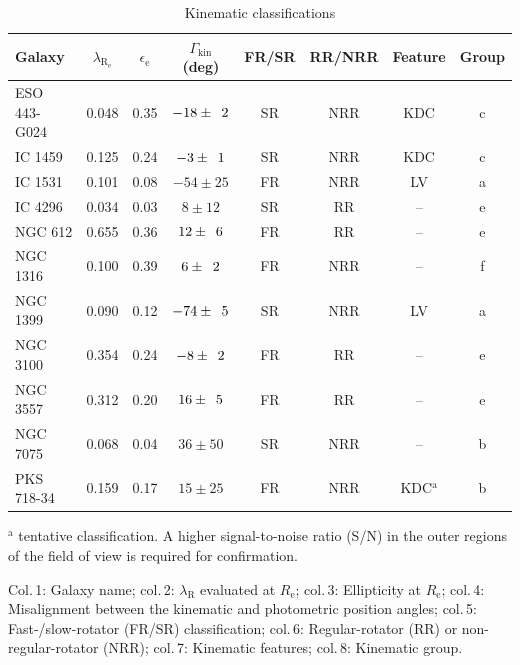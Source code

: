 		\begin{table}
			\centering
		\begin{threeparttable}
			\caption{Kinematic classifications}
			\label{tab:classify}
			\begin{tabular}{l c c c c c c c}
				\hline
				\hline
				Galaxy		& $\lambda_\mathrm{R_e}$ & $\epsilon_\mathrm{e}$  & $\Gamma_\text{kin}$ (deg) & FR/SR 	& RR/NRR 	& Feature & Group 	\\
				\hline 
				ESO 443-G024 & 0.048 & 0.35 & $-18\pm\leavevmode\phantom{0}2$	& SR & NRR & KDC & c \\
				IC 1459 	& 0.125 & 0.24 & \leavevmode\phantom{0}$-3\pm\leavevmode\phantom{0}1$ & SR & NRR & KDC & c \\
				IC 1531 	& 0.101 & 0.08 & $-54\pm25$	& FR & NRR & LV & a \\
				IC 4296		& 0.034 & 0.03 & \leavevmode\phantom{$-0$}$8\pm12$ & SR &\leavevmode\phantom{N}RR & -- & e \\
				NGC 612 	& 0.655 & 0.36 & \leavevmode\phantom{$-$}$12\pm\leavevmode\phantom{0}6$	& FR &\leavevmode\phantom{N}RR & -- & e \\
				NGC 1316 	& 0.100 & 0.39 & \leavevmode\phantom{$-0$}$6\pm\leavevmode\phantom{0}2$ & FR & NRR & -- & f \\
				NGC 1399 	& 0.090 & 0.12 & $-74\pm\leavevmode\phantom{0}5$ & SR & NRR & LV & a \\
				NGC 3100 	& 0.354 & 0.24 & \leavevmode\phantom{0}$-8\pm\leavevmode\phantom{0}2$ & FR &\leavevmode\phantom{N}RR & -- & e \\
				NGC 3557 	& 0.312 & 0.20 & \leavevmode\phantom{$-$}$16\pm\leavevmode\phantom{0}5$ & FR &\leavevmode\phantom{N}RR & -- & e\\
				NGC 7075 	& 0.068 & 0.04 & \leavevmode\phantom{$-$}$36\pm50$ & SR & NRR & -- & b \\
				PKS 718-34  & 0.159 & 0.17 & \leavevmode\phantom{$-$}$15\pm25$ & FR & NRR & KDC$^\text{a}$ & b\\
				\hline
				\hline
			\end{tabular}
			\begin{tablenotes}
			\footnotesize
			\note $^\text{a}$ tentative classification. A higher signal-to-noise ratio (S/N) in the outer regions of the field of view is required for confirmation.
			\item Col.\,1: Galaxy name; col.\,2: $\lambda_\mathrm{R}$ evaluated at $R_\mathrm{e}$; col.\,3: Ellipticity at $R_\mathrm{e}$; col.\,4: Misalignment between the kinematic and photometric position angles; col.\,5: Fast-/slow-rotator (FR/SR) classification; col.\,6: Regular-rotator (RR) or non-regular-rotator (NRR); col.\,7: Kinematic features; col.\,8: Kinematic group.
			\end{tablenotes}
		\end{threeparttable}
		\end{table}

